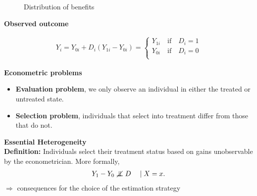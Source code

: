 \begin{frame}
\begin{figure}[htp]\centering\caption{Distribution of benefits}
\end{figure}
\end{frame}
\begin{frame}\textbf{Observed outcome}

\begin{align*}
Y_i = Y_{0i} + D_i (Y_{1i} - Y_{0i}) =
\begin{cases}
Y_{1i}\quad\text{if}\quad D_{i} = 1 \\
Y_{0i}\quad\text{if}\quad D_{i} = 0 \\
\end{cases}
\end{align*}

\end{frame}
\begin{frame}\textbf{Econometric problems}

\begin{itemize}\setlength\itemsep{1em}
\item \textbf{Evaluation problem}, we only observe an individual in either the treated or untreated state.
\item \textbf{Selection problem}, individuals that select into treatment differ from those that do not.
\end{itemize}

\end{frame}
\begin{frame}
	\textbf{Essential Heterogeneity}\\\vspace{0.5cm}
	\textbf{Definition:} Individuals select their treatment status based on
	gains unobservable by the econometrician. More formally,
	\begin{align*}
		Y_1 - Y_0 \notindep D\quad \mid X = x.
	\end{align*}
	\(\Rightarrow\) consequences for the choice of the estimation strategy
\end{frame}
